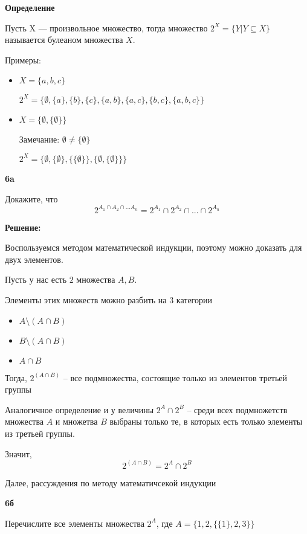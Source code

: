 \documentclass{article}
\begin{document}
\textbf{Определение}

Пусть X — произвольное множество, тогда множество $2^X = \{Y | Y \subseteq X\}$
называется булеаном множества $X$.

Примеры:

\begin{itemize}
    \item $X = \{a, b, c\}$
    
    $2^X = \{\emptyset, \{a\}, \{b\}, \{c\}, \{a, b\}, \{a, c\}, \{b, c\}, \{a, b, c\}\}$
    
    \item $X = \{\emptyset, \{ \emptyset \}\}$
    
    Замечание: $\emptyset \neq \{ \emptyset \}$
    
    $2^X = \{ \emptyset, \{\emptyset\}, \{\{ \emptyset \}\}, \{\emptyset, \{  \emptyset \}\}\}$
    
\end{itemize}

\textbf{6a}

Докажите, что 
$$2 ^ {A_1 \cap A_2 \cap ... A_n} = 2 ^ {A_1} \cap 2^{A_2} \cap ... \cap 2^{A_n}$$

\textbf{Решение:}

Воспользуемся методом математической индукции, поэтому можно доказать для двух элементов. 

Пусть у нас есть $2$ множества $A, B$. 

Элементы этих множеств можно разбить на $3$ категории 

\begin{itemize}
    \item $A \setminus (A \cap B)$
    \item $B \setminus (A \cap B)$
    \item $A \cap B$
\end{itemize}

Тогда, $2^{(A \cap B)}$ -- все подмножества, состоящие только из элементов третьей группы

Аналогичное определение и у величины $2^A \cap 2^B$ -- среди всех подмножетств множества $A$ и множетва $B$ выбраны только те, в которых есть только элементы из третьей группы. 

Значит, 
$$2^{(A \cap B)} = 2^A \cap 2^B$$

Далее, рассуждения по методу математичсекой индукции

\newpage

\textbf{6б}

Перечислите все элементы множества $2^A$, где $A = \{1, 2, \{\{1\}, 2, 3\}\}$
\end{document}
